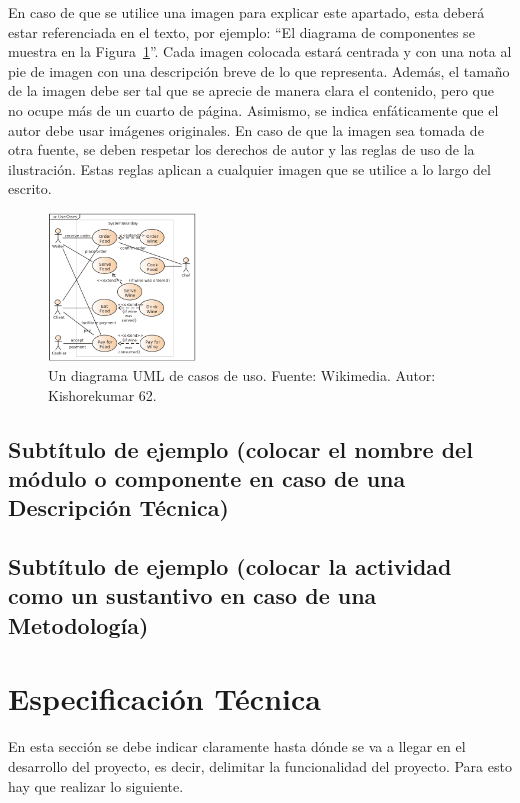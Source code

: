 En caso de que se utilice una imagen para explicar este apartado, esta deberá estar referenciada en el texto, por ejemplo: ``El diagrama de componentes se muestra en la Figura~\ref{fig:usecase}''. Cada imagen colocada estará centrada y con una nota al pie de imagen con una descripción breve de lo que representa. Además, el tamaño de la imagen debe ser tal que se aprecie de manera clara el contenido, pero que no ocupe más de un cuarto de página. Asimismo, se indica enfáticamente que el autor debe usar imágenes originales. En caso de que la imagen sea tomada de otra fuente, se deben respetar los derechos de autor y las reglas de uso de la ilustración. Estas reglas aplican a cualquier imagen que se utilice a lo largo del escrito.

\begin{figure}[H]
  \centering
  \includegraphics[width=0.35\textwidth]{use_case_restaurant_model}
  \caption{\label{fig:usecase} Un diagrama UML de casos de uso. Fuente: Wikimedia. Autor: Kishorekumar 62.}
\end{figure}

\subsection*{Subtítulo de ejemplo (colocar el nombre del módulo o componente en caso de una Descripción Técnica)}

\subsection*{Subtítulo de ejemplo (colocar la actividad como un sustantivo en caso de una Metodología)}

\section*{Especificación Técnica}%

En esta sección se debe indicar claramente hasta dónde se va a llegar en el desarrollo del proyecto, es decir, delimitar la funcionalidad del proyecto. Para esto hay que realizar lo siguiente.


